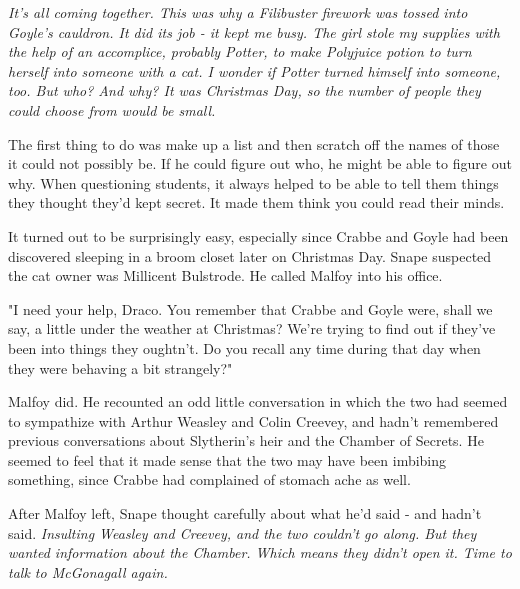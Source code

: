 \emph{It's all coming together. This was why a Filibuster firework was tossed into Goyle's cauldron. It did its job - it kept me busy. The girl stole my supplies with the help of an accomplice, probably Potter, to make Polyjuice potion to turn herself into someone with a cat. I wonder if Potter turned himself into someone, too. But who? And why? It was Christmas Day, so the number of people they could choose from would be small.}

The first thing to do was make up a list and then scratch off the names of those it could not possibly be. If he could figure out who, he might be able to figure out why. When questioning students, it always helped to be able to tell them things they thought they'd kept secret. It made them think you could read their minds.

It turned out to be surprisingly easy, especially since Crabbe and Goyle had been discovered sleeping in a broom closet later on Christmas Day. Snape suspected the cat owner was Millicent Bulstrode. He called Malfoy into his office.

"I need your help, Draco. You remember that Crabbe and Goyle were, shall we say, a little under the weather at Christmas? We're trying to find out if they've been into things they oughtn't. Do you recall any time during that day when they were behaving a bit{\el} strangely?"

Malfoy did. He recounted an odd little conversation in which the two had seemed to sympathize with Arthur Weasley and Colin Creevey, and hadn't remembered previous conversations about Slytherin's heir and the Chamber of Secrets. He seemed to feel that it made sense that the two may have been imbibing something, since Crabbe had complained of stomach ache as well.

After Malfoy left, Snape thought carefully about what he'd said - and hadn't said. \emph{Insulting Weasley and Creevey, and the two couldn't go along. But they wanted information about the Chamber. Which means they didn't open it. Time to talk to McGonagall again.}


